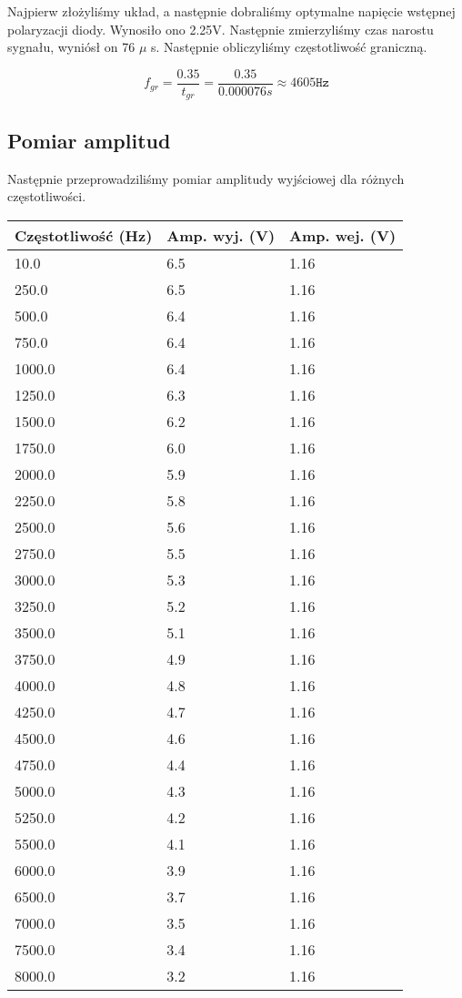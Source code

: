 \documentclass[a4paper,11pt]{article}
\begin{document}
Najpierw złożyliśmy układ, a następnie dobraliśmy optymalne napięcie wstępnej polaryzacji diody. Wynosiło ono 2.25V.
Następnie zmierzyliśmy czas narostu sygnału, wyniósł on 76 $\mu$ s. Następnie obliczyliśmy częstotliwość graniczną.

\begin{equation}
  f_{gr} = \frac{0.35}{t_{gr}} = \frac{0.35}{0.000076 s} \approx 4605 \texttt{Hz}
\end{equation}

\subsection{Pomiar amplitud}

Następnie przeprowadziliśmy pomiar amplitudy wyjściowej dla różnych częstotliwości.

\begin{center}
\begin{tabular}{|l|l|l|}\hline
Częstotliwość (Hz) & Amp. wyj. (V) & Amp. wej. (V) \\ \hline
10.0 & 6.5 & 1.16 \\
250.0 & 6.5 & 1.16 \\
500.0 & 6.4 & 1.16 \\
750.0 & 6.4 & 1.16 \\
1000.0 & 6.4 & 1.16 \\
1250.0 & 6.3 & 1.16 \\
1500.0 & 6.2 & 1.16 \\
1750.0 & 6.0 & 1.16 \\
2000.0 & 5.9 & 1.16 \\
2250.0 & 5.8 & 1.16 \\
2500.0 & 5.6 & 1.16 \\
2750.0 & 5.5 & 1.16 \\
3000.0 & 5.3 & 1.16 \\
3250.0 & 5.2 & 1.16 \\
3500.0 & 5.1 & 1.16 \\
3750.0 & 4.9 & 1.16 \\
4000.0 & 4.8 & 1.16 \\
4250.0 & 4.7 & 1.16 \\
4500.0 & 4.6 & 1.16 \\
4750.0 & 4.4 & 1.16 \\
5000.0 & 4.3 & 1.16 \\
5250.0 & 4.2 & 1.16 \\
5500.0 & 4.1 & 1.16 \\
6000.0 & 3.9 & 1.16 \\
6500.0 & 3.7 & 1.16 \\
7000.0 & 3.5 & 1.16 \\
7500.0 & 3.4 & 1.16 \\
8000.0 & 3.2 & 1.16 \\ \hline
\end{tabular}
\end{center}
\end{document}
